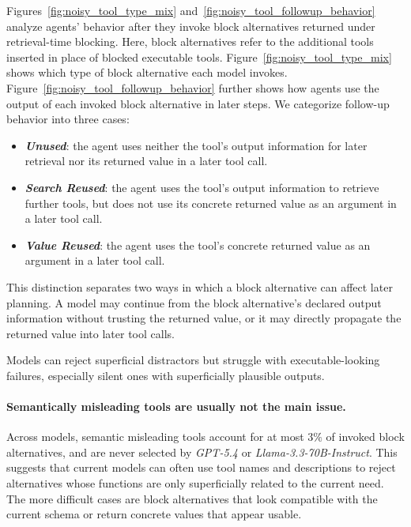 Figures~\ref{fig:noisy_tool_type_mix} and~\ref{fig:noisy_tool_followup_behavior} analyze agents' behavior after they invoke block alternatives returned under retrieval-time blocking.
Here, block alternatives refer to the additional tools inserted in place of blocked executable tools.
Figure~\ref{fig:noisy_tool_type_mix} shows which type of block alternative each model invokes.
Figure~\ref{fig:noisy_tool_followup_behavior} further shows how agents use the output of each invoked block alternative in later steps.
We categorize follow-up behavior into three cases:
\begin{itemize}[topsep=2pt, partopsep=3pt, leftmargin=*, itemsep=-3pt]
\item \textbf{\textit{Unused}}: the agent uses neither the tool's output information for later retrieval nor its returned value in a later tool call.
\item \textbf{\textit{Search Reused}}: the agent uses the tool's output information to retrieve further tools, but does not use its concrete returned value as an argument in a later tool call.
\item \textbf{\textit{Value Reused}}: the agent uses the tool's concrete returned value as an argument in a later tool call.
\end{itemize}
This distinction separates two ways in which a block alternative can affect later planning.
A model may continue from the block alternative's declared output information without trusting the returned value, or it may directly propagate the returned value into later tool calls.



\begin{takeaway}
Models can reject superficial distractors but struggle with executable-looking failures, especially silent ones with superficially plausible outputs.
\end{takeaway}


\paragraph{Semantically misleading tools are usually not the main issue.}
Across models, semantic misleading tools account for at most $3\%$ of invoked block alternatives, and are never selected by \textit{GPT-5.4} or \textit{Llama-3.3-70B-Instruct}.
This suggests that current models can often use tool names and descriptions to reject alternatives whose functions are only superficially related to the current need.
The more difficult cases are block alternatives that look compatible with the current schema or return concrete values that appear usable.

